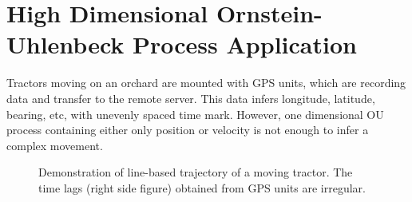 \section{High Dimensional Ornstein-Uhlenbeck Process Application}\label{SectionHighDimensionalOU}

Tractors moving on an orchard are mounted with GPS units, which are recording data and transfer to the remote server. This data infers longitude, latitude, bearing, etc, with unevenly spaced time mark. However, one dimensional OU process containing either only position or velocity is not enough to infer a complex movement. 

\begin{figure}[h]
\centering
{}
\caption{Demonstration of line-based trajectory of a moving tractor. The time lags (right side figure) obtained from GPS units are irregular.}
\label{realdatareview}
\end{figure}

